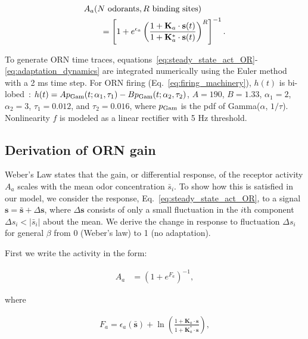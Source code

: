 \documentclass[9pt,lineno]{elife}
\begin{document}
\begin{align}
&A_a(N \textup { odorants}, R \textup { binding sites}) \nonumber \\
&\qquad = \left[1 + e^{\epsilon_a}\left(\frac{1 + \mathbf{K}_a\cdot\mathbf{s}(t)}{1 + \mathbf{K}^*_a\cdot\mathbf{s}(t)}\right)^R\right]^{-1}. 
\end{align} 




To generate ORN time traces, equations~\ref{eq:steady_state_act_OR}-\ref{eq:adaptation_dynamics} are integrated numerically using the Euler method with a 2 ms time step. For ORN firing (Eq.~\ref{eq:firing_machinery}), $h(t)$ is bi-lobed~\citep{martelli}: $h(t) = Ap_{\textup{Gam}}(t; \alpha_1, \tau_1) - Bp_{\textup{Gam}}(t; \alpha_2, \tau_2)$, $A = 190$, $B = 1.33$,  $\alpha_1=2$, $\alpha_2=3$, $\tau_1 = 0.012$, and $\tau_2 = 0.016$, where $p_{\textup{Gam}}$ is the pdf of Gamma($\alpha$, $1/\tau$). Nonlinearity $f$ is modeled as a linear rectifier with 5 Hz threshold. \\




\subsection{Derivation of ORN gain} 



Weber's Law states that the gain, or differential response, of the receptor activity $A_a$ scales with the mean odor concentration $\bar s_i$. To show how this is satisfied in our model, we consider the response, Eq.~\ref{eq:steady_state_act_OR}, to a signal $\mathbf{s} = \bar {\mathbf{s}} + \Delta \mathbf{s}$, where $\Delta \mathbf s$ consists of only a small fluctuation in the $i$th component $\Delta s_i < |\bar s_i|$ about the mean. We derive the change in response to fluctuation $\Delta s_i$ for general $\beta$ from 0 (Weber's law) to 1 (no adaptation).

First we write the activity in the form:

\begin{align}
A_a &= (1 + e^{F_a})^{-1},
\end{align}

where

\begin{align}
F_a = \epsilon_a(\bar {\mathbf s}) + 
\ln\left(\frac
{1 + \mathbf{K}_a\cdot {\mathbf{s}}} 
{1 + \mathbf{K}^*_a\cdot {\mathbf{s}}} 
\right),
\end{align}
\end{document}

